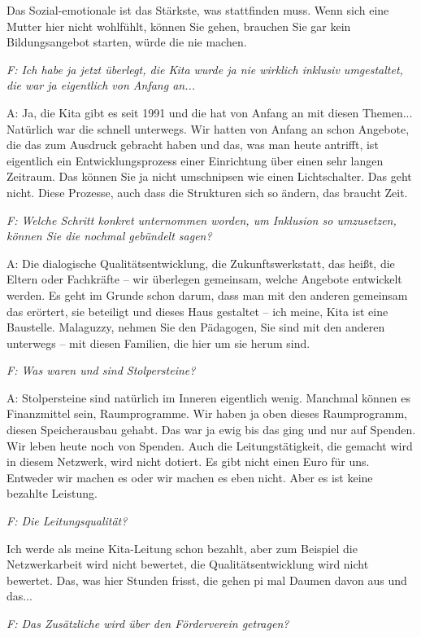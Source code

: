 \begin{linenumbers*}
Das Sozial-emotionale ist das Stärkste, was stattfinden muss. Wenn sich eine Mutter hier nicht wohlfühlt, können Sie gehen, brauchen Sie gar kein Bildungsangebot starten, würde die nie machen.  

\emph{F: Ich habe ja jetzt überlegt, die Kita wurde ja nie wirklich inklusiv umgestaltet, die war ja eigentlich von Anfang an...}

A: Ja, die Kita gibt es seit 1991 und die hat von Anfang an mit diesen Themen... Natürlich war die schnell unterwegs. Wir hatten von Anfang an schon Angebote, die das zum Ausdruck gebracht haben und das, was man heute antrifft, ist eigentlich ein Entwicklungsprozess einer Einrichtung über einen sehr langen Zeitraum. Das können Sie ja nicht umschnipsen wie einen Lichtschalter. Das geht nicht. Diese Prozesse, auch dass die Strukturen sich so ändern, das braucht Zeit. 

\emph{F: Welche Schritt konkret unternommen worden, um Inklusion so umzusetzen, können Sie die nochmal gebündelt sagen?}

A: Die dialogische Qualitätsentwicklung, die Zukunftswerkstatt, das heißt, die Eltern oder Fachkräfte -- wir überlegen gemeinsam, welche Angebote entwickelt werden. Es geht im Grunde schon darum, dass man mit den anderen gemeinsam das erörtert, sie beteiligt und dieses Haus gestaltet -- ich meine, Kita ist eine Baustelle. Malaguzzy, nehmen Sie den Pädagogen, Sie sind mit den anderen unterwegs -- mit diesen Familien, die hier um sie herum sind. 

\emph{F: Was waren und sind Stolpersteine?}

A: Stolpersteine sind natürlich im Inneren eigentlich wenig. Manchmal können es Finanzmittel sein, Raumprogramme. Wir haben ja oben dieses Raumprogramm, diesen Speicherausbau gehabt. Das war ja ewig bis das ging und nur auf Spenden. Wir leben heute noch von Spenden. Auch die Leitungstätigkeit, die gemacht wird in diesem Netzwerk, wird nicht dotiert. Es gibt nicht einen Euro für uns. Entweder wir machen es oder wir machen es eben nicht. Aber es ist keine bezahlte Leistung.          

\emph{F: Die Leitungsqualität?}

Ich werde als meine Kita-Leitung schon bezahlt, aber zum Beispiel die Netzwerkarbeit wird nicht bewertet, die Qualitätsentwicklung wird nicht bewertet. Das, was hier Stunden frisst, die gehen pi mal Daumen davon aus und das...

\emph{F: Das Zusätzliche wird über den Förderverein getragen?}


\end{linenumbers*}
